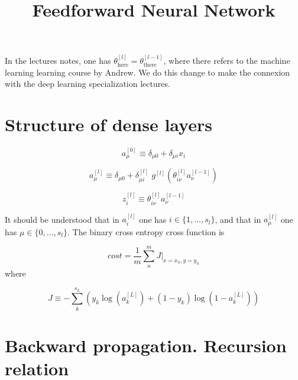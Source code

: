 \documentclass[a4paper,11pt]{article}
\title{Feedforward Neural Network}
\newcommand{\na}[2]{a_{#1}^{[#2]}}
\newcommand{\nz}[2]{z_{#1}^{[#2]}}
\newcommand{\nt}[3]{\theta_{#1 #2}^{[#3]}}
\newcommand{\ff}[2]{#1 \left(#2 \right)}
\begin{document}
In the lectures notes, one has $\theta^{[l]}_{\text{here}}=\theta^{[l-1]}_{\text{there}}$, where
there refers to the machine learning learning course by Andrew.
We do this change to make the connexion with the 
deep learning specialization lectures.


\section{Structure of dense layers}


\begin{equation}
    \na{\mu}{0} \equiv \delta_{\mu0}+\delta_{\mu i} x_i %
\end{equation}

\begin{equation}
    \na{\mu}{l} \equiv \delta_{\mu0} +\delta_{\mu i }^{[l]}\,\,
    \ff{g^{[l]}}{  \nt{i}{\nu}{l}\na{\nu }{l-1}  }  %
\end{equation}

\begin{equation}
    \nz{i}{l}\equiv \nt{i}{\nu}{l}\na{\nu }{l-1} %
\end{equation}

It should be understood that in $\na{i}{l}$ 
one has  $i \in \{1,..., s_l\} $, 
and that in $\na{\mu}{l}$ one has $ \mu \in \{0,..., s_l\}$. The binary cross entropy cross function is

\begin{equation}
    cost=\frac1m \sum^m_n 
    J \Big\vert_{x=x_n,y=y_n}  %
\end{equation}
where

\begin{equation}
    J\equiv -\sum^{s_L}_k
    \left(
        y_k\ff{\log}{\na{k}{L}}  %
        +(1-y_k)\ff{\log}{1-\na{k}{L}} 
    \right)
\end{equation}





\section{Backward propagation.  Recursion relation}



%
%
\end{document}
